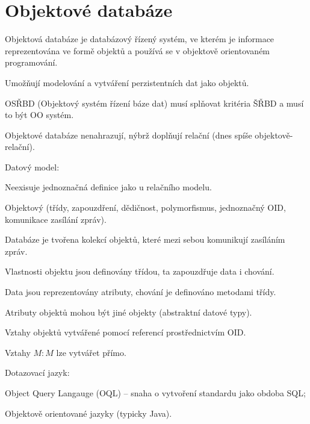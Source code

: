 \section{Objektové databáze}

\begin{compactitem}
    \item Objektová databáze je databázový řízený systém, ve kterém je informace reprezentována ve formě objektů a používá se v objektově orientovaném programování.

    \item Umožňují modelování a vytváření perzistentních dat jako objektů.

    \item OSŘBD (Objektový systém řízení báze dat) musí splňovat kritéria ŠŘBD a musí to být OO systém.

    \item Objektové databáze nenahrazují, nýbrž doplňují relační (dnes spíše objektově-relační).

    \item Datový model: \begin{compactitem}
        \item Neexisuje jednoznačná definice jako u relačního modelu.
        \item Objektový (třídy, zapouzdření, dědičnost, polymorfismus, jednoznačný OID, komunikace zasílání zpráv).

        \item Databáze je tvořena kolekcí objektů, které mezi sebou komunikují zasíláním zpráv.

        \item Vlastnosti objektu jsou definovány třídou, ta zapouzdřuje data i chování.

        \item Data jsou reprezentovány atributy, chování je definováno metodami třídy.

        \item Atributy objektů mohou být jiné objekty (abstraktní datové typy).
        \item Vztahy objektů vytvářené pomocí referencí prostřednictvím OID.
        \item Vztahy $M:M$ lze vytvářet přímo.
    \end{compactitem}

    \item Dotazovací jazyk: \begin{compactitem}
        \item Object Query Langauge (OQL) -- snaha o vytvoření standardu jako obdoba SQL;
        \item Objektově orientované jazyky (typicky Java).
    \end{compactitem}


\end{compactitem}

